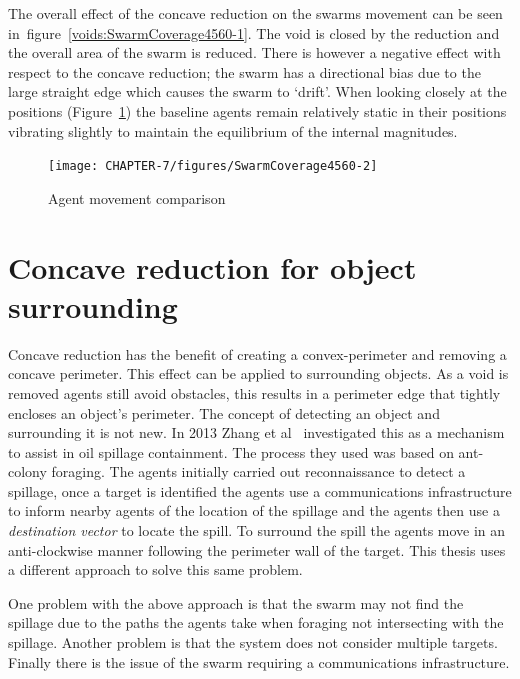 The overall effect of the concave reduction on the swarms movement can be seen in~figure~\ref{voids:SwarmCoverage4560-1}. The void is closed by the reduction and the overall area of the swarm is reduced. There is however a negative effect with respect to the concave reduction; the swarm has a directional bias due to the large straight edge which causes the swarm to `drift'. When looking closely at the positions (Figure~\ref{voids:SwarmCoverage4560-2}) the baseline agents remain relatively static in their positions vibrating slightly to maintain the equilibrium of the internal magnitudes. 
\begin{figure}[H]
\begin{center}
\texttt{[image: CHAPTER-7/figures/SwarmCoverage4560-2]}
\end{center}
\caption{Agent movement comparison\label{voids:SwarmCoverage4560-2}}
\end{figure}

\section{Concave reduction for object surrounding}\label{voids:ObjectSurrounding}
Concave reduction has the benefit of creating a convex-perimeter and removing a concave perimeter. This effect can be applied to surrounding objects. As a void is removed agents still avoid obstacles, this results in a perimeter edge that tightly encloses an object's perimeter. The concept of detecting an object and surrounding it is not new. In 2013 Zhang et al~\cite{ZFG:13} investigated this as a mechanism to assist in oil spillage containment. The process they used was based on ant-colony foraging. The agents initially carried out reconnaissance to detect a spillage, once a target is identified the agents use a communications infrastructure to inform nearby agents of the location of the spillage and the agents then use a \textit{destination vector} to locate the spill. To surround the spill the agents move in an anti-clockwise manner following the perimeter wall of the target. This thesis uses a different approach to solve this same problem.

One problem with the above approach is that the swarm may not find the spillage due to the paths the agents take when foraging not intersecting with the spillage. Another problem is that the system does not consider multiple targets. Finally there is the issue of the swarm requiring a communications infrastructure. 

